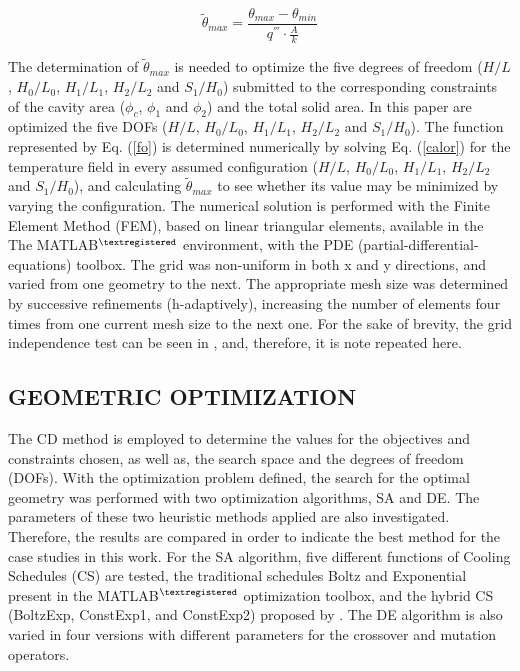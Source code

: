 \documentclass[10pt,fleqn,a4paper,twoside]{article}
\begin{document}
\begin{equation}
\tilde{\theta}_{max}=\frac{\theta_{max}-\theta_{min}}{q^{'''}\cdot\frac{A}{k}}\label{fo}
\end{equation}

The determination of $\tilde{\theta}_{max}$ is needed to optimize the five degrees of freedom ($H/L$, $H_{0}/L_{0}$, $H_{1}/L_{1}$, $H_{2}/L_{2}$ and $S_{1}/H_{0}$) submitted to the corresponding constraints of the cavity area ($\phi_{c}$, $\phi_{1}$ and $\phi_{2}$) and the total solid area. In this paper are optimized the five DOFs ($H/L$, $H_{0}/L_{0}$, $H_{1}/L_{1}$, $H_{2}/L_{2}$ and $S_{1}/H_{0}$). The function represented by Eq. (\ref{fo}) is determined numerically by solving Eq. (\ref{calor}) for the temperature field in every assumed configuration ($H/L$, $H_{0}/L_{0}$, $H_{1}/L_{1}$, $H_{2}/L_{2}$ and $S_{1}/H_{0}$), and calculating $\tilde{\theta}_{max}$ to see whether its value may be minimized by varying the configuration. The numerical solution is performed with the Finite Element Method (FEM)\citep{Reddy1994}, based on linear triangular elements, available in the The MATLAB$^{\tiny ®}$ environment, with the PDE (partial-differential-equations) toolbox. The grid was non-uniform in both x and y directions, and varied from one geometry to the next. The appropriate mesh size was determined by successive refinements (h-adaptively), increasing the number of elements four times from one current mesh size to the next one. For the sake of brevity, the grid independence test can be seen in \cite{Gonzales2015b}, and, therefore, it is note repeated here.

\subsection{GEOMETRIC OPTIMIZATION}

The CD method is employed to determine the values for the  objectives and constraints chosen, as well as, the search space and the degrees of freedom (DOFs). With the optimization problem defined, the search for the optimal geometry was performed with two optimization algorithms, SA and DE. The parameters of these two heuristic methods applied are also investigated. Therefore, the results are compared in order to indicate the best method for the case studies in this work. For the SA algorithm, five different functions of Cooling Schedules (CS) are tested, the traditional schedules Boltz and Exponential present in the MATLAB$^{\tiny ®}$ optimization toolbox, and the hybrid CS (BoltzExp, ConstExp1, and ConstExp2) proposed by \cite{Gonzales2015b, Gonzales2015}. The DE algorithm is also  varied in four versions with different parameters for the crossover and mutation operators.
\end{document}
